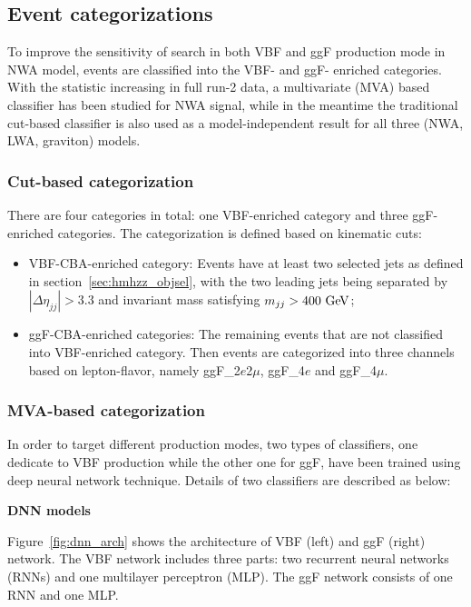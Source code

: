 \subsection{Event categorizations}
To improve the sensitivity of search in both VBF and ggF production mode in NWA model, events are classified into the VBF- and ggF- enriched categories.
With the statistic increasing in full run-2 data, a multivariate (MVA) based classifier has been studied for NWA signal, 
while in the meantime the traditional cut-based classifier is also used as a model-independent result for all three (NWA, LWA, graviton) models.

\subsubsection{Cut-based categorization}
There are four categories in total: one VBF-enriched category and three ggF-enriched categories.
The categorization is defined based on kinematic cuts:
\begin{itemize}
	\item VBF-CBA-enriched category: Events have at least two selected jets as defined in section~\ref{sec:hmhzz_objsel}, with the two leading jets being separated by $|\Delta \eta_{jj}| > 3.3$ and invariant mass satisfying $m_{jj} > 400~\text{Ge\kern -0.1em V}$;
	\item ggF-CBA-enriched categories: The remaining events that are not classified into VBF-enriched category. Then events are categorized into three channels based on lepton-flavor, namely ggF\_2$e$2$\mu$, ggF\_4$e$ and ggF\_4$\mu$. 
\end{itemize}

\subsubsection{MVA-based categorization}
In order to target different production modes, two types of classifiers, one dedicate to VBF production while the other one for ggF, have been trained using deep neural network technique.
Details of two classifiers are described as below:

\textbf{DNN models} 

Figure~\ref{fig:dnn_arch} shows the architecture of VBF (left) and ggF (right) network.
The VBF network includes three parts: two recurrent neural networks (RNNs) and one multilayer perceptron (MLP).
The ggF network consists of one RNN and one MLP.

